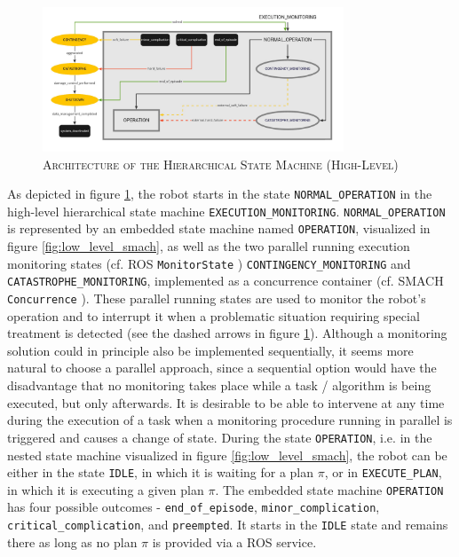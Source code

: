 \documentclass[english, master, utf8]{base/thesis_KBS}
\newcommand{\code}[1]{\colorbox{light-gray}{\texttt{#1}}}
\begin{document}
\begin{figure}[H]
    \centering
    \includegraphics[width=0.8\textwidth]{pics/SMACH_high_level.jpg}
    \caption{\textsc{Architecture of the Hierarchical State Machine (High-Level)}}
    \label{fig:high_level_smach}
\end{figure}
\noindent
As depicted in figure \ref{fig:high_level_smach}, the robot starts in the state \code{NORMAL\_OPERATION} in the high-level hierarchical state machine \code{EXECUTION\_MONITORING}.
\code{NORMAL\_OPERATION} is represented by an embedded state machine named \code{OPERATION}, visualized in figure \ref{fig:low_level_smach}, as well as the two
parallel running execution monitoring states (cf. ROS \code{MonitorState} \cite{monitor_state}) \code{CONTINGENCY\_MONITORING} and \code{CATASTROPHE\_MONITORING}, 
implemented as a concurrence container (cf. SMACH \code{Concurrence} \cite{concurrence_container}).
These parallel running states are used to monitor the robot's operation and to interrupt it when a problematic situation requiring special treatment is detected
(see the dashed arrows in figure \ref{fig:high_level_smach}).
Although a monitoring solution could in principle also be implemented sequentially, it seems more natural to choose a parallel approach, since a sequential option
would have the disadvantage that no monitoring takes place while a task / algorithm is being executed, but only afterwards.
It is desirable to be able to intervene at any time during the execution of a task when a monitoring procedure running in parallel is triggered and causes a change of state.
During the state \code{OPERATION}, i.e. in the nested state machine visualized in figure \ref{fig:low_level_smach}, the robot can be either in the state \code{IDLE}, 
in which it is waiting for a plan $\pi$, or in \code{EXECUTE\_PLAN}, in which it is executing a given plan $\pi$. The embedded state machine \code{OPERATION} has 
four possible outcomes - \code{end\_of\_episode}, \code{minor\_complication}, \code{critical\_complication}, and \code{preempted}. 
It starts in the \code{IDLE} state and remains there as long as no plan $\pi$ is provided via a ROS service.
\end{document}
